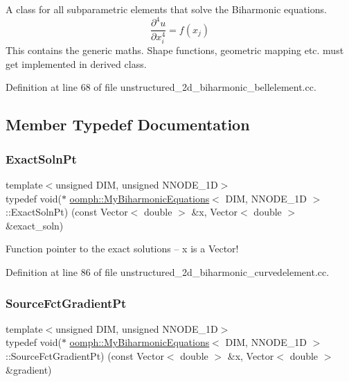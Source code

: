 A class for all subparametric elements that solve the Biharmonic equations. \[ \frac{\partial^4 u}{\partial x_i^4} = f(x_j) \] This contains the generic maths. Shape functions, geometric mapping etc. must get implemented in derived class. 

Definition at line 68 of file unstructured\+\_\+2d\+\_\+biharmonic\+\_\+bellelement.\+cc.



\subsection{Member Typedef Documentation}
\mbox{\label{classoomph_1_1MyBiharmonicEquations_a20238fec79ab67b90f3be58ea498e681}} 
\subsubsection{\texorpdfstring{Exact\+Soln\+Pt}{ExactSolnPt}}
{\footnotesize\ttfamily template$<$unsigned D\+IM, unsigned N\+N\+O\+D\+E\+\_\+1D$>$ \\
typedef void($\ast$ \hyperlink{classoomph_1_1MyBiharmonicEquations}{oomph\+::\+My\+Biharmonic\+Equations}$<$ D\+IM, N\+N\+O\+D\+E\+\_\+1D $>$\+::Exact\+Soln\+Pt) (const Vector$<$ double $>$ \&x, Vector$<$ double $>$ \&exact\+\_\+soln)}



Function pointer to the exact solutions -- x is a Vector! 



Definition at line 86 of file unstructured\+\_\+2d\+\_\+biharmonic\+\_\+curvedelement.\+cc.

\mbox{\label{classoomph_1_1MyBiharmonicEquations_af007c03701e888fed7375cb4537f0046}} 
\subsubsection{\texorpdfstring{Source\+Fct\+Gradient\+Pt}{SourceFctGradientPt}\hspace{0.1cm}{\footnotesize\ttfamily [1/2]}}
{\footnotesize\ttfamily template$<$unsigned D\+IM, unsigned N\+N\+O\+D\+E\+\_\+1D$>$ \\
typedef void($\ast$ \hyperlink{classoomph_1_1MyBiharmonicEquations}{oomph\+::\+My\+Biharmonic\+Equations}$<$ D\+IM, N\+N\+O\+D\+E\+\_\+1D $>$\+::Source\+Fct\+Gradient\+Pt) (const Vector$<$ double $>$ \&x, Vector$<$ double $>$ \&gradient)}



